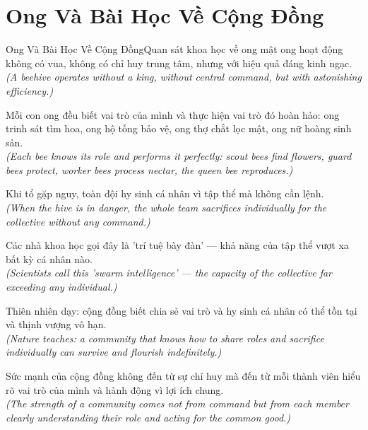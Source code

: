 \section{Ong Và Bài Học Về Cộng Đồng}
\begin{truyen}{Ong Và Bài Học Về Cộng Đồng}{Quan sát khoa học về ong mật}
 ong hoạt động không có vua, không có chỉ huy trung tâm, nhưng với hiệu quả đáng kinh ngạc.\\[4pt]
\textit{(A beehive operates without a king, without central command, but with astonishing efficiency.)}

Mỗi con ong đều biết vai trò của mình và thực hiện vai trò đó hoàn hảo: ong trinh sát tìm hoa, ong hộ tống bảo vệ, ong thợ chắt lọc mật, ong nữ hoàng sinh sản.\\[4pt]
\textit{(Each bee knows its role and performs it perfectly: scout bees find flowers, guard bees protect, worker bees process nectar, the queen bee reproduces.)}

Khi tổ gặp nguy, toàn đội hy sinh cá nhân vì tập thể mà không cần lệnh.\\[4pt]
\textit{(When the hive is in danger, the whole team sacrifices individually for the collective without any command.)}

Các nhà khoa học gọi đây là 'trí tuệ bày đàn' --- khả năng của tập thể vượt xa bất kỳ cá nhân nào.\\[4pt]
\textit{(Scientists call this 'swarm intelligence' --- the capacity of the collective far exceeding any individual.)}

Thiên nhiên dạy: cộng đồng biết chia sẻ vai trò và hy sinh cá nhân có thể tồn tại và thịnh vượng vô hạn.\\[4pt]
\textit{(Nature teaches: a community that knows how to share roles and sacrifice individually can survive and flourish indefinitely.)}

\end{truyen}
\begin{baihoc}
  Sức mạnh của cộng đồng không đến từ sự chỉ huy mà đến từ mỗi thành viên hiểu rõ vai trò của mình và hành động vì lợi ích chung.\\[4pt]
  \textit{(The strength of a community comes not from command but from each member clearly understanding their role and acting for the common good.)}
\end{baihoc}

